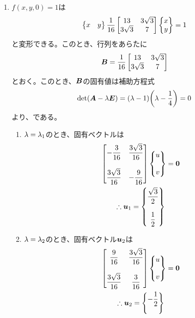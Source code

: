 \begin{ans*}
\begin{enumerate}[label=(\arabic*)]
    \item $f(x,y,0) = 1$は
    \begin{gather}
      \begin{Bmatrix}x & y\end{Bmatrix}\frac{1}{16}
      \begin{bmatrix}
        13 & 3\sqrt{3} \\
        3\sqrt{3} & 7
      \end{bmatrix}\begin{Bmatrix}
        x \\ y
      \end{Bmatrix} = 1
    \end{gather}
    と変形できる。このとき、行列をあらたに
    \begin{gather}
      \bm{B} =\frac{1}{16}\begin{bmatrix}
        13 & 3\sqrt{3} \\
        3\sqrt{3} & 7
      \end{bmatrix}
    \end{gather}
    とおく。このとき、$\bm{B}$の固有値は補助方程式
    \begin{align}
      \det(\bm{A} - {\lambda}\bm{E}) = ({\lambda} - 1)\biggl({\lambda} - \frac{1}{4}\biggr) = 0
    \end{align}
    より、である。
    \begin{enumerate}[label=(\roman*)]
      \item ${\lambda} = {\lambda}_1$のとき、固有ベクトルは
      \begin{gather}
        \begin{bmatrix}
          \displaystyle -\frac{3}{16} & \displaystyle \frac{3\sqrt{3}}{16} \\
          & \\
          \displaystyle \frac{3\sqrt{3}}{16} & \displaystyle-\frac{9}{16}
        \end{bmatrix}\begin{Bmatrix}\displaystyle u \\ \\ \displaystyle v\end{Bmatrix} = \bm{0} \\
        \therefore {\bm{u}}_1 = \begin{Bmatrix}
          \displaystyle \frac{\sqrt{3}}{2} \\
          \\
          \displaystyle \frac{1}{2}
        \end{Bmatrix}
      \end{gather}
      \item ${\lambda} = {\lambda}_2$のとき、固有ベクトル${\bm{u}}_2$は
      \begin{gather}
        \begin{bmatrix}
          \displaystyle \frac{9}{16} & \displaystyle \frac{3\sqrt{3}}{16} \\
          & \\
          \displaystyle \frac{3\sqrt{3}}{16} & \displaystyle\frac{3}{16}
        \end{bmatrix}\begin{Bmatrix}u  \\ \\ v\end{Bmatrix} = \bm{0} \\
        \therefore {\bm{u}}_2 = \begin{Bmatrix}
          \displaystyle -\frac{1}{2} \\
          \\
\end{Bmatrix}
\end{gather}
\end{enumerate}
\end{enumerate}
\end{ans*}
